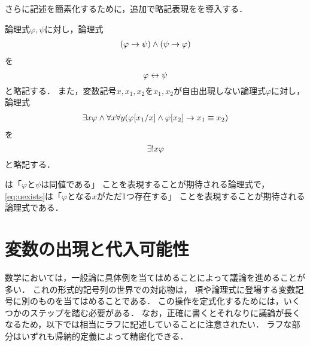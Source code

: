 
さらに記述を簡素化するために，追加で略記表現をを導入する．

\begin{Def} \label{Def:AbbreviatioForFormula}
	論理式\(\varphi, \psi\)に対し，論理式
	\begin{align*}
		\paren{\varphi \to \psi} \land \paren{\psi \to \varphi}
	\end{align*}
	を
	\begin{equation}
		\varphi \leftrightarrow \psi
		\label{eq:formulaequiv}
	\end{equation}
	と略記する．
	また，変数記号\(x, x_1, x_2\)を\(x_1, x_2\)が自由出現しない論理式\(\varphi\)に対し，論理式
	\begin{align*}
		\exists x \varphi \land \forall x \forall y \paren{\subst{\varphi}{x_1/x} \land \subst{\varphi}{x_2} \to x_1 \objeq x_2}
	\end{align*}
	を
	\begin{equation}
		{\exists !} x \varphi
		\label{eq:uexists}
	\end{equation}
	と略記する．

	は「\(\varphi\)と\(\psi\)は同値である」
	ことを表現することが期待される論理式で，
	\cref{eq:uexists}は「\(\varphi\)となる\(x\)がただ1つ存在する」
	ことを表現することが期待される論理式である．
\end{Def}

\section{変数の出現と代入可能性} \label{sec:substitution}

数学においては，一般論に具体例を当てはめることによって議論を進めることが多い．
これの形式的記号列の世界での対応物は，
項や論理式に登場する変数記号に別のものを当てはめることである．
この操作を定式化するためには，いくつかのステップを踏む必要がある．
なお，正確に書くとそれなりに議論が長くなるため，以下では相当にラフに記述していることに注意されたい．
ラフな部分はいずれも帰納的定義によって精密化できる．


